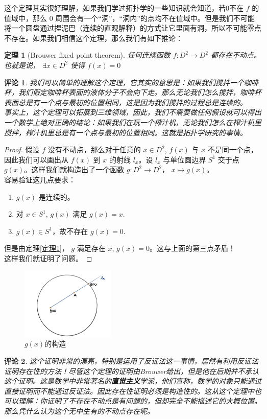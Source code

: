 \documentclass[a4paper,10pt]{article}
\newtheorem{theorem}{定理}[section]
\newtheorem{remark}{评论}
\begin{document}
这个定理其实很好理解，如果我们学过拓扑学的一些知识就会知道，若0不在 $ f  $ 的值域中，那么 $ 0 $ 周围会有一个“洞”，“洞内”的点均不在值域中。但是我们不可能将一个圆盘通过捏泥巴（连续的直观解释）的方式让它里面有洞，所以不可能零点不存在。如果我们相信这个定理，那么我们有如下推论：
\begin{theorem}[Brouwer fixed point theorem]
    任何连续函数 $ f:D^2\rightarrow D^2  $ 都存在不动点。也就是说， $ \exists x\in D^2 $ 使得 $ f(x)=0 $ 
\end{theorem}
\begin{remark}
    我们可以简单的理解这个定理，它其实的意思是：如果我们搅拌一个咖啡杯，我们假定咖啡杯表面的液体分子不会向下走。那么无论我们怎么搅拌，咖啡杯表面总是有一个点与最初的位置相同，这是因为我们搅拌的过程总是连续的。\\
    事实上，这个定理可以拓展到三维领域，因此，我们不需要做任何假设就可以得出一个数学上绝对正确的结论：如果我们在玩一个榨汁机，无论我们怎么在榨汁机里搅拌，榨汁机里总是有一个点与最初的位置相同。这就是拓扑学研究的事情。
\end{remark}
\begin{proof}
    假设 $ f  $ 没有不动点，那么对于任意的 $ x\in D^2 $,  $ f(x)  $ 与 $ x  $ 不是同一个点，因此我们可以画出从 $ f(x) $ 到 $ x  $ 的射线 $ l_x $。设 $ l_x  $ 与单位圆边界 $ S^1 $ 交于点 $ g(x) $。这样我们就构造出了一个函数 $ g:D^2\rightarrow D^2  $， $  x\mapsto g(x) $。\\
    容易验证这几点要求：
    \begin{enumerate}
        \item $ g(x) $ 是连续的。
        \item 对 $ x\in S^1 $, $ g(x) $ 满足 $ g(x)=x $.
        \item  $ g(x)\in S^1 $，故不存在 $ g(x)=0 $.  
    \end{enumerate}  
    但是由定理\ref{定理1}， $ g  $ 满足存在 $ x $,  $ g(x)=0 $。这与上面的第三点矛盾！\\
    这样我们就证明了问题。   
\end{proof}
\begin{figure}[htb]
    \centering
    \includegraphics[width=0.4\textwidth]{Brouwer.jpg}
    \caption{$ g(x) $的构造}
    \label{Brouwer定理}
\end{figure}
\begin{remark}
    这个证明非常的漂亮，特别是运用了反证法这一事情，居然有利用反证法证明存在性的方法！尽管这个定理的证明由Brouwer给出，但是他在后期并不承认这个证明。这是数学中非常著名的\textbf{直觉主义}学派，他们宣称，数学的对象只能通过直接证明而不能通过反证法。因此存在性证明必须是构造性的。这从这个定理中也可以理解：你证明了不存在不动点是有问题的，但却完全不能描述它的大概位置。那么凭什么认为这个无中生有的不动点存在呢。
\end{remark}
\end{document}
